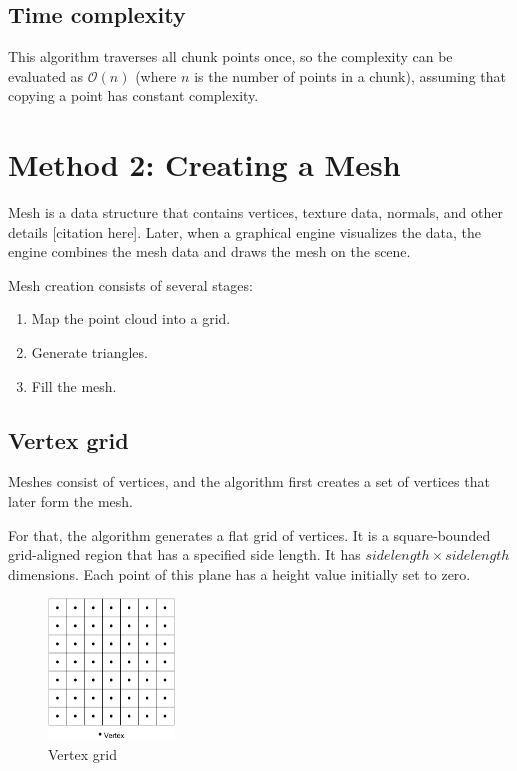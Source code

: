 \subsection{Time complexity}

This algorithm traverses all chunk points once, so the complexity can be evaluated as $\mathcal{O}(n)$ (where $n$ is the number of points in a chunk), assuming that copying a point has constant complexity.


\section{Method 2: Creating a Mesh}
\label{sec:creating_mesh}

Mesh is a data structure that contains vertices, texture data, normals, and other details [citation here]. Later, when a graphical engine visualizes the data, the engine combines the mesh data and draws the mesh on the scene.

Mesh creation consists of several stages:

\begin{enumerate}
    \item Map the point cloud into a grid.
    \item Generate triangles.
    \item Fill the mesh.
\end{enumerate}


\subsection{Vertex grid}

Meshes consist of vertices, and the algorithm first creates a set of vertices that later form the mesh.

For that, the algorithm generates a flat grid of vertices. It is a square-bounded grid-aligned region that has a specified side length. It has $side length \times side length$ dimensions. Each point of this plane has a height value initially set to zero.

\begin{figure}[ht]
    \centering
    \includegraphics[width=0.3\textwidth]{vertex-grid.pdf}
    \caption{Vertex grid}
    \label{fig:vertex_grid}
\end{figure}


